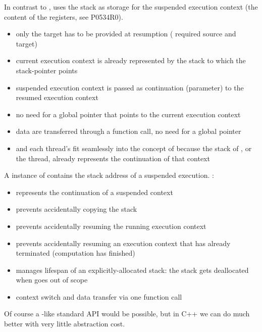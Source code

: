 

In contrast to \uc, \cc uses the stack as storage for the suspended
execution context (the content of the registers, see P0534R0\cite{P0534R0}).

\begin{itemize}
    \item only the target has to be provided at resumption
        ( required source and target)
    \item current execution context is already represented by the
        stack to which the stack-pointer points
    \item suspended execution context is passed as continuation (parameter) 
        to the resumed execution context
    \item no need for a global pointer that points to the current execution context
    \item data are transferred through a function call, no need for a global pointer
    \item \main and each thread's \entryfn fit seamlessly into the concept of \cc
        because the stack of \main, or the thread, already represents the continuation of
        that context
\end{itemize}


A instance of \cont contains the stack address of a suspended execution.
\cont:

\begin{itemize}
    \item represents the continuation of a suspended context
    \item prevents accidentally copying the stack
    \item prevents accidentally resuming the running execution
        context
    \item prevents accidentally resuming an execution context that has already
        terminated (computation has finished)
    \item manages lifespan of an explicitly-allocated stack: the stack gets
        deallocated when \cont goes out of scope
    \item context switch and data transfer via one function call
\end{itemize}

Of course a \uc-like standard API would be possible, but in C++ we can do much
better with very little abstraction cost.

